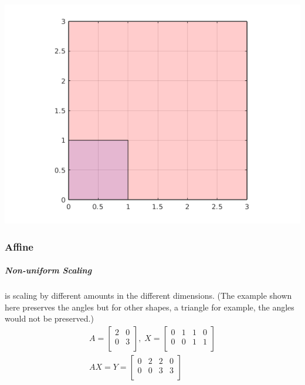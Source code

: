 \documentclass[MathsNotesBase.tex]{subfiles}
\begin{document}
{		\begin{center}
		\includegraphics[scale=0.85]{resources/img/GeometryOfMatrices_images/uniform_scaling.png}
		\end{center}
		
		\subsubsection{Affine}
		\subparagraph{Non-uniform Scaling} is scaling by different amounts in the different dimensions. (The example shown here preserves the angles but for other shapes, a triangle for example, the angles would not be preserved.)
		\begin{align*}
		A =
		\begin{bmatrix}    
		2  &  0 \\
		0  &  3 \\		
		\end{bmatrix}
		,\; X = 
		\begin{bmatrix}  
		0   &  1  &   1  &   0 \\
		0   &  0  &   1  &   1	\\	
		\end{bmatrix} \\[10pt]
		AX = Y = 
		\begin{bmatrix}   
		0  &   2  &  2  &  0 \\
		0  &   0  &  3  &  3 \\
		\end{bmatrix}
		\end{align*}
	
}
\end{document}
